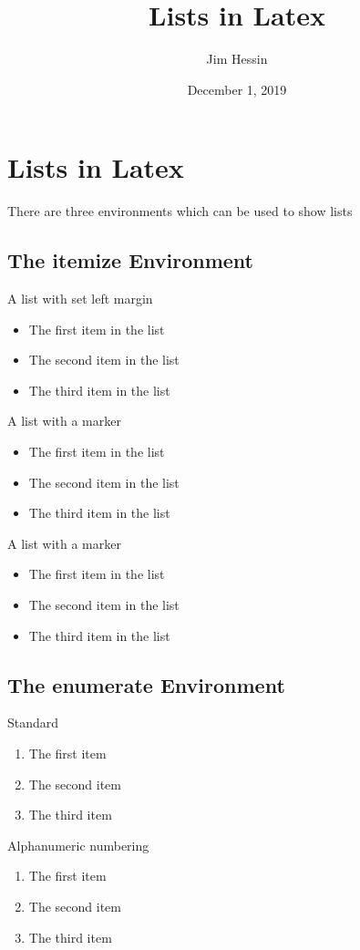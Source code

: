 \documentclass[letterpaper,12pt]{article}
\title{Lists in Latex}
\author{Jim Hessin}
\date{December  1, 2019}
\begin{document}
\maketitle

\section{Lists in Latex}
There are three environments which can be used to show lists

\subsection{The itemize Environment}

A list with set left margin
\begin{itemize}[leftmargin=3in]
  \item The first item in the list
  \item The second item in the list
  \item The third item in the list
\end{itemize}
A list with a \ast{} marker

\begin{itemize}[label=$\ast$]
  \item The first item in the list
  \item The second item in the list
  \item The third item in the list
\end{itemize}
A list with a \star{} marker

\begin{itemize}[label=$\star$]
  \item The first item in the list
  \item The second item in the list
  \item The third item in the list
\end{itemize}

\subsection{The enumerate Environment}

Standard
\begin{enumerate}[]
  \item The first item
  \item The second item
  \item The third item
\end{enumerate}

Alphanumeric numbering
\begin{enumerate}[label=\alph*)]
  \item The first item
  \item The second item
  \item The third item
\end{enumerate}
\end{document}
